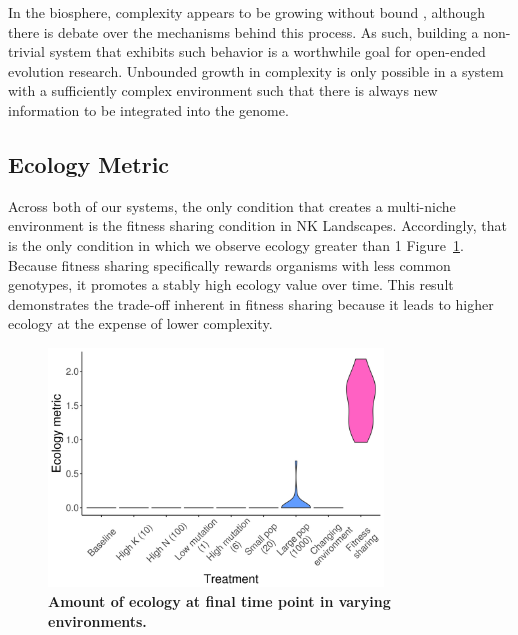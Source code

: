 \documentclass[letterpaper]{article}
\begin{document}
In the biosphere, complexity appears to be growing without bound \citep{Korb:2011kg}, although there is debate over the mechanisms behind this process. As such, building a non-trivial system that exhibits such behavior is a worthwhile goal for open-ended evolution research. Unbounded growth in complexity is only possible in a system with a sufficiently complex environment such that there is always new information to be integrated into the genome.

\subsection{Ecology Metric}

Across both of our systems, the only condition that creates a multi-niche environment is the fitness sharing condition in NK Landscapes. Accordingly, that is the only condition in which we observe ecology greater than 1 Figure~\ref{ecology}. Because fitness sharing specifically rewards organisms with less common genotypes, it promotes a stably high ecology value over time. This result demonstrates the trade-off inherent in fitness sharing because it leads to higher ecology at the expense of lower complexity.

\begin{figure}
\includegraphics[width=3.5in]{figs/ecologyboxplots.png}
\caption{\textbf{Amount of ecology at final time point in varying environments.} }
\label{ecology}
\end{figure}
\end{document}

